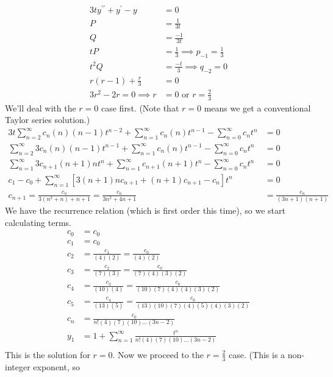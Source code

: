 \documentclass[fleqn,letterpaper]{report}
\begin{document}
\begin{example}
\begin{align*}
3ty^{\prime \prime} + y^\prime - y & = 0 \\
P & = \frac{1}{3t} \\
Q & = \frac{-1}{3t} \\
tP & = \frac{1}{3} \implies p_{-1} = \frac{1}{3} \\
t^2 Q & = \frac{-t}{3} \implies q_{-2} = 0 \\
r(r-1) + \frac{r}{3} & = 0 \\
3r^2 - 2r = 0 \implies r & = 0 \text{ or } r = \frac{2}{3} 
\end{align*}
We'll deal with the $r=0$ case first. (Note that $r=0$ means we
get a conventional Taylor series solution.)
\begin{align*}
3t \sum_{n=2}^\infty c_n (n) (n-1) t^{n-2} 
+ \sum_{n=1}^\infty c_n (n) t^{n-1} 
- \sum_{n=0}^\infty c_n t^{n} & = 0 \\
\sum_{n=2}^\infty 3c_n (n) (n-1) t^{n-1} 
+ \sum_{n=1}^\infty c_n (n) t^{n-1} 
- \sum_{n=0}^\infty c_n t^{n} & = 0 \\
\sum_{n=1}^\infty 3c_{n+1} (n+1) n t^n 
+ \sum_{n=1}^\infty c_{n+1} (n+1) t^n 
- \sum_{n=0}^\infty c_n t^{n} & = 0 \\
c_1 - c_0 + \sum_{n=1}^\infty \left[ 3(n+1)n c_{n+1} + (n+1)
c_{n+1} - c_n \right] t^n & = 0 \\
c_{n+1} = \frac{c_n}{3(n^2+n) + n+1} = \frac{c_n}{3n^2 +4n +1}
& = \frac{c_n}{(3n+1)(n+1)} 
\end{align*}
We have the recurrence relation (which is first order this
time), so we start calculating terms.
\begin{align*}
c_0 & = c_0 \\
c_1 & = c_0 \\
c_2 & = \frac{c_1}{(4)(2)} = \frac{c_0}{(4)(2)} \\
c_3 & = \frac{c_2}{(7)(3)} = \frac{c_0}{(7)(4)(3)(2)} \\
c_4 & = \frac{c_3}{(10)(4)} = \frac{c_0}{(10)(7)(4)(4)(3)(2)} \\
c_5 & = \frac{c_4}{(13)(5)} = \frac{c_0}{(13)(10)(7)(4)
(5)(4)(3)(2)} \\
c_n & = \frac{c_0}{n! (4)(7)(10) \ldots (3n-2)} \\
y_1 & = 1 + \sum_{n=1}^\infty \frac{t^n}{n! (4)(7)(10) \ldots
(3n-2)} \\
\end{align*}
This is the solution for $r=0$. Now we proceed to the
$r=\frac{2}{3}$ case. (This is a non-integer exponent, so

\end{example}
\end{document}
